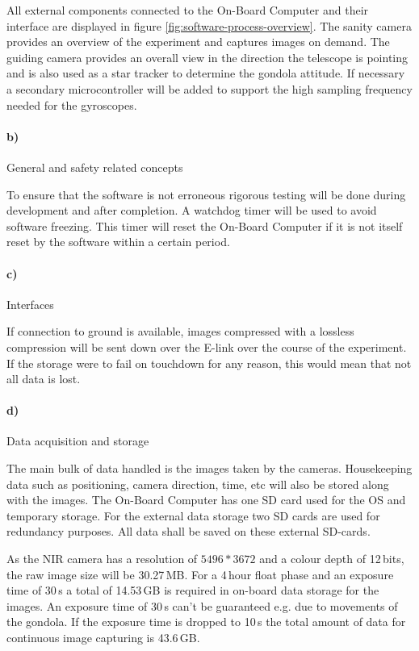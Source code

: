 All external components connected to the On-Board Computer and their interface are displayed in figure \ref{fig:software-process-overview}. The sanity camera provides an overview of the experiment and captures images on demand. The guiding camera provides an overall view in the direction the telescope is pointing and is also used as a star tracker to determine the gondola attitude. If necessary a secondary microcontroller will be added to support the high sampling frequency needed for the gyroscopes.

\paragraph{b)} General and safety related concepts

To ensure that the software is not erroneous rigorous testing will be done during development and after completion. A watchdog timer will be used to avoid software freezing. This timer will reset the On-Board Computer if it is not itself reset by the software within a certain period.

\paragraph{c)} Interfaces

If connection to ground is available, images compressed with a lossless compression will be sent down over the E-link over the course of the experiment. If the storage were to fail on touchdown for any reason, this would mean that not all data is lost.



\paragraph{d)} Data acquisition and storage

The main bulk of data handled is the images taken by the cameras. Housekeeping data such as positioning, camera direction, time, etc will also be stored along with the images. The On-Board Computer has one SD card used for the OS and temporary storage. For the external data storage two SD cards are used for redundancy purposes. All data shall be saved on these external SD-cards.

As the NIR camera has a resolution of $5496 * 3672$ and a colour depth of 12\,bits, the raw image size will be 30.27\,MB. For a 4\,hour float phase and an exposure time of 30\,s a total of  14.53\,GB is required in on-board data storage for the images. An exposure time of 30\,s can't be guaranteed e.g. due to movements of the gondola. If the exposure time is dropped to 10\,s the total amount of data for continuous image capturing is  43.6\,GB.

